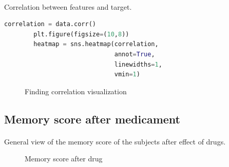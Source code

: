 \documentclass{article}
\begin{document}
    \paragraph{}
    Correlation between features and target.
    \begin{lstlisting}[language=Python]
        correlation = data.corr()
        plt.figure(figsize=(10,8))
        heatmap = sns.heatmap(correlation,
                              annot=True,
                              linewidths=1,
                              vmin=1)
    \end{lstlisting}
    \begin{figure}[!htb]
        \caption{\label{fig:correlation} Finding correlation visualization}
    \end{figure}
    \newpage
    \subsection{Memory score after medicament}
    \paragraph{}
    General view of the memory score of the subjects after effect of drugs.
    \begin{figure}[!htb]
        \caption{\label{fig:msa-general-view} Memory score after drug}
    \end{figure}
\end{document}
